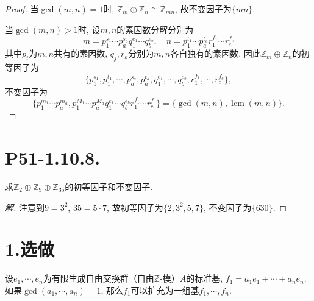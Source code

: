 \documentclass[12pt, a4paper, fontset=windows]{ctexart}
\newcommand{\Z}{\mathbb{Z}}
\newcommand{\isom}{\cong} %
\newcommand{\kh}[1]{（{#1}）} %
\newcommand{\lcm}{\operatorname{lcm}}
\newcommand{\xuan}{{\normalsize 选做}}
\newenvironment{solution}{\begin{proof}[解]}{\end{proof}}
\begin{document}
\begin{proof}
当$\gcd(m,n)=1$时, $\Z_m\oplus\Z_n\isom\Z_{mn}$, 故不变因子为$\{mn\}$. 

当$\gcd(m,n)>1$时, 设$m,n$的素因数分解分别为
\[m=p_1^{s_1}\cdots p_a^{s_a}q_1^{e_1}\cdots q_b^{e_b},\quad n=p_1^{t_1}\cdots p_a^{t_a}r_1^{f_1}\cdots r_c^{f_c}\]
其中$p_i$为$m,n$共有的素因数, $q_j,r_k$分别为$m,n$各自独有的素因数. 
因此$\Z_m\oplus\Z_n$的初等因子为
\[\{p_1^{s_1},p_1^{t_1},\cdots,p_a^{s_a},p_a^{t_a},q_1^{e_1},\cdots,q_b^{e_b},r_1^{f_1},\cdots,r_c^{f_c}\},\]
不变因子为\[\{p_1^{m_1}\cdots p_a^{m_a},p_1^{M_1}\cdots p_a^{M_a}q_1^{e_1}\cdots q_b^{e_b}r_1^{f_1}\cdots r_c^{f_c}\}=\{\gcd(m,n),\lcm(m,n)\}.\]
\end{proof}

\section*{P51-1.10.8.}

求$\Z_2\oplus\Z_9\oplus\Z_{35}$的初等因子和不变因子. 

\begin{solution}
注意到$9=3^2$, $35=5\cdot 7$, 故初等因子为$\{2,3^2,5,7\}$, 不变因子为$\{630\}$. 
\end{solution}

\section*{1.\xuan}

设$e_1,\cdots,e_n$为有限生成自由交换群\kh{自由$\Z$-模}$A$的标准基, $f_1=a_1e_1+\cdots+a_ne_n$. 
如果$\gcd(a_1,\cdots,a_n)=1$, 那么$f_1$可以扩充为一组基$f_1,\cdots,f_n$. 
\end{document}
